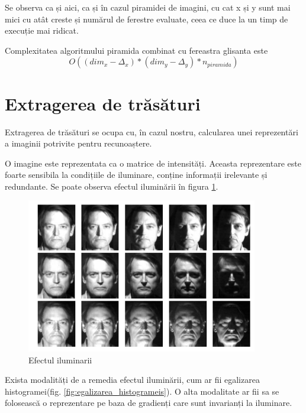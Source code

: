 Se observa ca și aici, ca și în cazul piramidei de imagini, cu cat x și y sunt mai mici cu atât creste și numărul de ferestre evaluate, ceea ce duce la un timp de execuție mai ridicat.

Complexitatea algoritmului piramida combinat cu fereastra glisanta este 
$${O((dim_x-\Delta_x)*(dim_y-\Delta_y)*n_{piramida})}$$

\pagebreak
\section{Extragerea de trăsături}

Extragerea de trăsături se ocupa cu, în cazul nostru, calcularea unei reprezentări a imaginii potrivite pentru recunoaștere.

O imagine este reprezentata ca o matrice de intensități.
Aceasta reprezentare este foarte sensibila la condițiile de iluminare, conține informații irelevante și redundante.
Se poate observa efectul iluminării în figura \ref{fig:efectul_iluminarii}.

\begin{figure}[H]
	\centering
		\includegraphics[width=0.90\textwidth]{imagini/efectul_iluminarii.png}
	\caption{Efectul iluminarii}
	\label{fig:efectul_iluminarii}
\end{figure}

Exista modalități de a remedia efectul iluminării, cum ar fii egalizarea histogramei(fig. \ref{fig:egalizarea_histogrameis}).
O alta modalitate ar fii sa se folosească o reprezentare pe baza de gradienți care sunt invarianți la iluminare.

